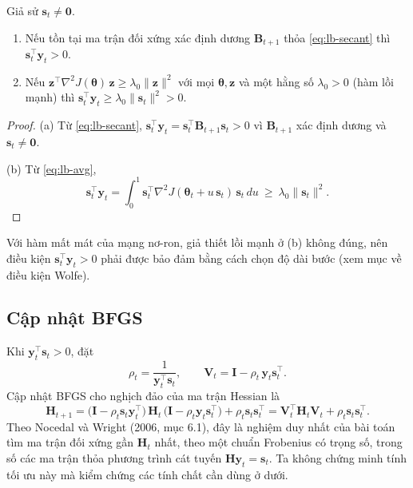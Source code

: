 \begin{proposition}\label{prop:lb-curv}
Giả sử $\mathbf{s}_t\neq\mathbf{0}$.
\begin{enumerate}
  \item[(a)] Nếu tồn tại ma trận đối xứng xác định dương $\mathbf{B}_{t+1}$ thỏa \eqref{eq:lb-secant} thì $\mathbf{s}_t^{\top}\mathbf{y}_t>0$.
  \item[(b)] Nếu $\mathbf{z}^{\top}\nabla^2J(\boldsymbol{\theta})\,\mathbf{z}\ge\lambda_0\|\mathbf{z}\|^2$ với mọi $\boldsymbol{\theta},\mathbf{z}$ và một hằng số $\lambda_0>0$ (hàm lồi mạnh) thì $\mathbf{s}_t^{\top}\mathbf{y}_t\ge\lambda_0\|\mathbf{s}_t\|^2>0$.
\end{enumerate}
\end{proposition}

\begin{proof}
(a) Từ \eqref{eq:lb-secant}, $\mathbf{s}_t^{\top}\mathbf{y}_t=\mathbf{s}_t^{\top}\mathbf{B}_{t+1}\mathbf{s}_t>0$ vì $\mathbf{B}_{t+1}$ xác định dương và $\mathbf{s}_t\ne\mathbf{0}$.

(b) Từ \eqref{eq:lb-avg},
\begin{equation*}  \mathbf{s}_t^{\top}\mathbf{y}_t=\int_0^1\mathbf{s}_t^{\top}\nabla^2J(\boldsymbol{\theta}_t+u\,\mathbf{s}_t)\,\mathbf{s}_t\,du\ \ge\ \lambda_0\|\mathbf{s}_t\|^2. 
\end{equation*}
\end{proof}

Với hàm mất mát của mạng nơ-ron, giả thiết lồi mạnh ở (b) không đúng, nên điều kiện $\mathbf{s}_t^{\top}\mathbf{y}_t>0$ phải được bảo đảm bằng cách chọn độ dài bước (xem mục về điều kiện Wolfe).

\subsection{Cập nhật BFGS}
Khi $\mathbf{y}_t^{\top}\mathbf{s}_t>0$, đặt
\begin{equation}\label{eq:lb-rhoV}
  \rho_t=\frac{1}{\mathbf{y}_t^{\top}\mathbf{s}_t},
  \qquad
  \mathbf{V}_t=\mathbf{I}-\rho_t\,\mathbf{y}_t\mathbf{s}_t^{\top}.
\end{equation}
Cập nhật BFGS cho nghịch đảo của ma trận Hessian là
\begin{equation}\label{eq:lb-bfgs}
  \mathbf{H}_{t+1}=\big(\mathbf{I}-\rho_t\mathbf{s}_t\mathbf{y}_t^{\top}\big)\,\mathbf{H}_t\,\big(\mathbf{I}-\rho_t\mathbf{y}_t\mathbf{s}_t^{\top}\big)+\rho_t\mathbf{s}_t\mathbf{s}_t^{\top}
  =\mathbf{V}_t^{\top}\mathbf{H}_t\mathbf{V}_t+\rho_t\mathbf{s}_t\mathbf{s}_t^{\top}.
\end{equation}
Theo Nocedal và Wright (2006, mục 6.1), đây là nghiệm duy nhất của bài toán tìm ma trận đối xứng gần $\mathbf{H}_t$ nhất, theo một chuẩn Frobenius có trọng số, trong số các ma trận thỏa phương trình cát tuyến $\mathbf{H}\mathbf{y}_t=\mathbf{s}_t$. Ta không chứng minh tính tối ưu này mà kiểm chứng các tính chất cần dùng ở dưới.

